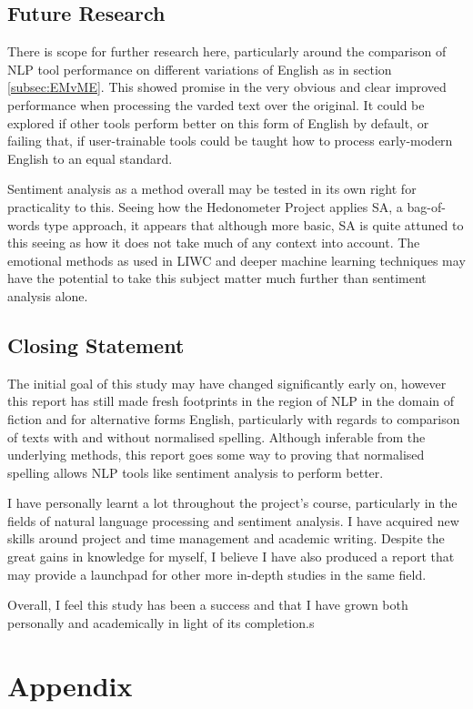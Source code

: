 \documentclass{article}
\begin{document}
    \subsection{Future Research}
        There is scope for further research here, particularly around the comparison of NLP tool performance on different variations of English as in section \ref{subsec:EMvME}. This showed promise in the very obvious and clear improved performance when processing the varded text over the original. It could be explored if other tools perform better on this form of English by default, or failing that, if user-trainable tools could be taught how to process early-modern English to an equal standard.

        Sentiment analysis as a method overall may be tested in its own right for practicality to this. Seeing how the Hedonometer Project applies SA, a bag-of-words type approach, it appears that although more basic, SA is quite attuned to this seeing as how it does not take much of any context into account. The emotional methods as used in LIWC and deeper machine learning techniques may have the potential to take this subject matter much further than sentiment analysis alone.
    \subsection{Closing Statement}
        The initial goal of this study may have changed significantly early on, however this report has still made fresh footprints in the region of NLP in the domain of fiction and for alternative forms English, particularly with regards to comparison of texts with and without normalised spelling. Although inferable from the underlying methods, this report goes some way to proving that normalised spelling allows NLP tools like sentiment analysis to perform better.

        I have personally learnt a lot throughout the project's course, particularly in the fields of natural language processing and sentiment analysis. I have acquired new skills around project and time management and academic writing. Despite the great gains in knowledge for myself, I believe I have also produced a report that may provide a launchpad for other more in-depth studies in the same field.
        
        Overall, I feel this study has been a success and that I have grown both personally and academically in light of its completion.s
\label{sec:conclusion}
\newpage

\newpage
\section*{Appendix}
\end{document}
